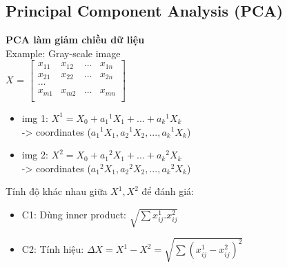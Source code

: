 \documentclass{article}
\begin{document}
\begin{itemize}
\section{Principal Component Analysis (PCA)} 
\textbf{ PCA làm giảm chiều dữ liệu}\\
Example: Gray-scale image \\
    $X$ = 
    $\begin{bmatrix}
     x_{11} & x_{12} & ... & x_{1n}\\ 
     x_{21} & x_{22} & ... & x_{2n}\\
     ...\\
     x_{m1} & x_{m2} & ... & x_{mn}\\
    \end{bmatrix}$
\begin{itemize}
    \item img 1: $X^1 = X_0 + {a_1}^1X_1 + ... +{a_k}^1X_k $\\
    -> coordinates (${a_1}^1X_1, {a_2}^1X_2,...,{a_k}^1X_k$)
    \item img 2: $X^2 = X_0 + {a_1}^2X_1 + ... +{a_k}^2X_k $\\
    -> coordinates (${a_1}^2X_1, {a_2}^2X_2,...,{a_k}^2X_k$)
\end{itemize}
Tính độ khác nhau giữa $X^1, X^2$ để đánh giá: 
\begin{itemize}
    \item C1: Dùng inner product: $\sqrt{\sum x_{ij}^1.x_{ij}^2}$
    \item C2: Tính hiệu: $\Delta X = X^1 - X^2 = \sqrt{\sum (x_{ij}^1-x_{ij}^2)^2}$
\end{itemize}
    

\end{itemize}
\end{document}
